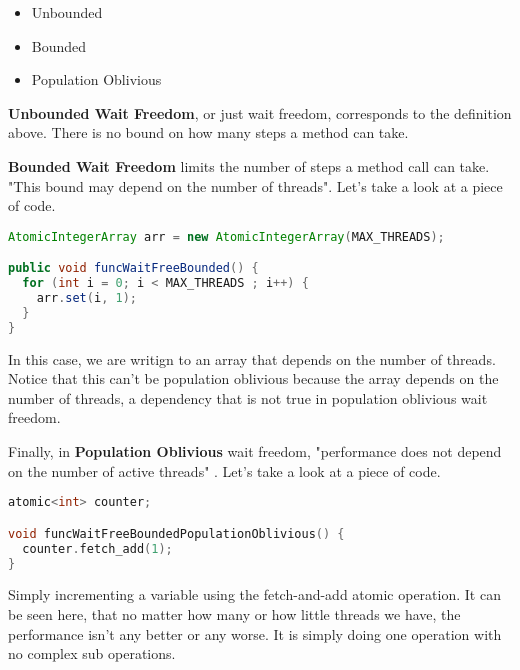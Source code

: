 \documentclass[letterpaper, 12pt]{article}
\begin{document}
\begin{itemize}
  \item Unbounded
  \item Bounded
  \item Population Oblivious
\end{itemize}
\newpage

{\bfseries Unbounded Wait Freedom}, or just wait freedom, corresponds to the definition above. There is no bound on how many steps a method can take. 

\par\vspace{\baselineskip}

{\bfseries Bounded Wait Freedom} limits the number of steps a method call can take. "This bound 
may depend on the number of threads"\citep[p. 59]{artofmulti}. Let's take a look at a 
piece of code. \citep{concurrencyfreaks}

\begin{lstlisting}[language=Java]
AtomicIntegerArray arr = new AtomicIntegerArray(MAX_THREADS);

public void funcWaitFreeBounded() {
  for (int i = 0; i < MAX_THREADS ; i++) {
    arr.set(i, 1);
  }
}
\end{lstlisting} 

In this case, we are writign to an array that depends on the number of threads. Notice that this can't be 
population oblivious because the array depends on the number of threads, a dependency that is not 
true in population oblivious wait freedom.

\par\vspace{\baselineskip}
Finally, in {\bfseries Population Oblivious} wait freedom, "performance does not depend on the 
number of active threads" \citep[p. 59]{artofmulti}. Let's take a look at a piece of code. \citep{concurrencyfreaks}

\begin{lstlisting}[language=C++]
atomic<int> counter;

void funcWaitFreeBoundedPopulationOblivious() {
  counter.fetch_add(1);
}
\end{lstlisting} 

Simply incrementing a variable using the fetch-and-add atomic operation. It can be seen here, that no 
matter how many or how little threads we have, the performance isn't any better or any worse. 
It is simply doing one operation with no complex sub operations.

\par\vspace{\baselineskip}
\end{document}
